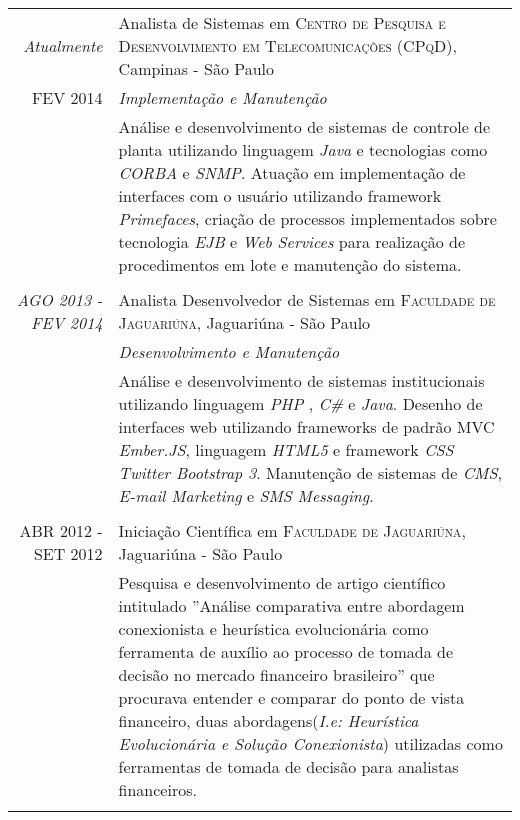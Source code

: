 \documentclass[a4paper,10pt]{article} %
\begin{document}
\begin{samepage}
\begin{tabular}{r|p{11cm}}

\emph{Atualmente} & Analista de Sistemas em \textsc{Centro de Pesquisa e Desenvolvimento em Telecomunicações (CPqD)}, Campinas - São Paulo \emph{} \\
\textsc{FEV 2014} & \emph{Implementação e Manutenção}\\ 
                  & \footnotesize{Análise e desenvolvimento de sistemas de controle de planta utilizando linguagem \textit{Java} e tecnologias como \textit{CORBA} e \textit{SNMP}. Atuação em implementação de interfaces com o usuário utilizando framework \textit{Primefaces}, criação de processos implementados sobre tecnologia \textit{EJB} e \textit{Web Services} para realização de procedimentos em lote e manutenção do sistema.}\\
\multicolumn{2}{c}{} \\


\emph{AGO 2013 - FEV 2014} & Analista Desenvolvedor de Sistemas em \textsc{Faculdade de Jaguariúna}, Jaguariúna - São Paulo \emph{}\\
& \emph{Desenvolvimento e Manutenção}\\ 
                  & \footnotesize{Análise e desenvolvimento de sistemas institucionais utilizando linguagem \textit{ PHP }, \textit{ C\# } e \textit{Java}. Desenho de interfaces web utilizando frameworks de padrão MVC \textit{Ember.JS}, linguagem \textit{HTML5} e framework \textit{CSS Twitter Bootstrap 3}. Manutenção de sistemas de \textit{CMS}, \textit{E-mail Marketing} e \textit{SMS Messaging}.}\\
\multicolumn{2}{c}{} \\


\textsc{ABR 2012 - SET 2012} & Iniciação Científica em \textsc{Faculdade de Jaguariúna}, Jaguariúna - São Paulo \emph{}\\
                           & \footnotesize{Pesquisa e desenvolvimento de artigo científico intitulado ''Análise comparativa entre abordagem conexionista e heurística evolucionária como ferramenta de auxílio ao processo de tomada de decisão no mercado financeiro brasileiro'' que procurava entender e comparar do ponto de vista financeiro, duas abordagens(\textit{I.e: Heurística Evolucionária e Solução Conexionista}) utilizadas como ferramentas de tomada de decisão para analistas financeiros.}\\
\multicolumn{2}{c}{} \\


\end{tabular}
\end{samepage}
\end{document}

